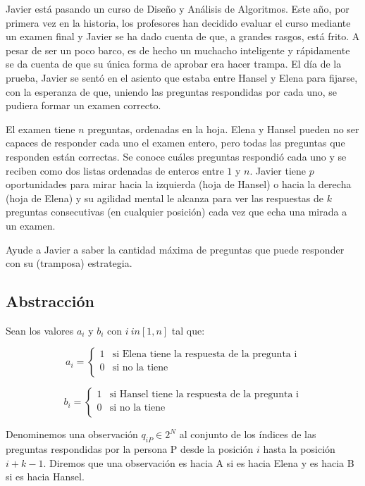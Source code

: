 \documentclass{article}
\begin{document}
Javier está pasando un curso de Diseño y Análisis de Algoritmos. Este año, por primera vez en la historia, los profesores han decidido evaluar el curso mediante un examen final y Javier se ha dado cuenta de que, a grandes rasgos, está frito. A pesar de ser un poco barco, es de hecho un muchacho inteligente y rápidamente se da cuenta de que su única forma de aprobar era hacer trampa. El día de la prueba, Javier se sentó en el asiento que estaba entre Hansel y Elena para fijarse, con la esperanza de que, uniendo las preguntas respondidas por cada uno, se pudiera formar un examen correcto.

El examen tiene $n$ preguntas, ordenadas en la hoja. Elena y Hansel pueden no ser capaces de responder cada uno el examen entero, pero todas las preguntas que responden están correctas. Se conoce cuáles preguntas respondió cada uno y se reciben como dos listas ordenadas de enteros entre $1$ y $n$. Javier tiene $p$ oportunidades para mirar hacia la izquierda (hoja de Hansel) o hacia la derecha (hoja de Elena) y su agilidad mental le alcanza para ver las respuestas de $k$ preguntas consecutivas (en cualquier posición) cada vez que echa una mirada a un examen.

Ayude a Javier a saber la cantidad máxima de preguntas que puede responder con su (tramposa) estrategia.

\subsection{Abstracción}

Sean los valores $a_i$ y $b_i$ con $i\ in [1,n]$ tal que:

$$
a_i =
\begin{cases}
1 & \text{si Elena tiene la respuesta de la pregunta i} \\
0 & \text{si no la tiene}\\
\end{cases}
$$

$$
b_i =
\begin{cases}
1 & \text{si Hansel tiene la respuesta de la pregunta i} \\
0 & \text{si no la tiene}\\
\end{cases}
$$

Denominemos una observación $q_{iP} \in 2^N$ al conjunto de los índices de las preguntas respondidas por la persona P desde la posición $i$ hasta la posición $i+k-1$. Diremos que una observación es hacia A si es hacia Elena y es hacia B si es hacia Hansel.
\end{document}
